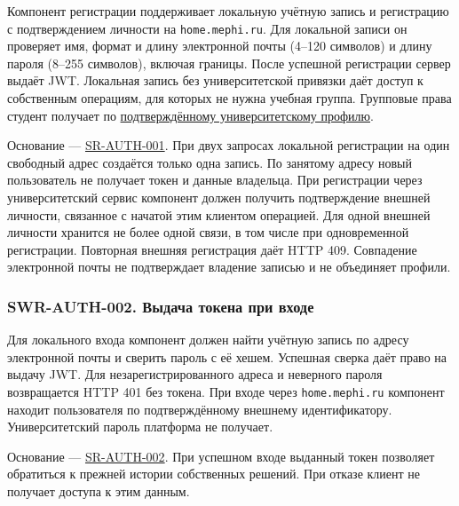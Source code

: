\documentclass[12pt,a4paper]{article}
\begin{document}
\hypertarget{swr-auth-001-создание-учётной-записи}{}

\hypertarget{swr-auth-001}{}

Компонент регистрации поддерживает локальную учётную запись и регистрацию с подтверждением личности на \texttt{home.\allowbreak{}mephi.\allowbreak{}ru}. Для локальной записи он проверяет имя, формат и длину электронной почты (4--120 символов) и длину пароля (8--255 символов), включая границы. После успешной регистрации сервер выдаёт JWT. Локальная запись без университетской привязки даёт доступ к собственным операциям, для которых не нужна учебная группа. Групповые права студент получает по {\hyperlink{swr-auth-006}{подтверждённому университетскому профилю}}.

Основание --- {\href{../04\_Системные\_требования/DOC-05\_Системные\_требования.pdf\#sr-auth-001}{SR-AUTH-001}}. При двух запросах локальной регистрации на один свободный адрес создаётся только одна запись. По занятому адресу новый пользователь не получает токен и данные владельца. При регистрации через университетский сервис компонент должен получить подтверждение внешней личности, связанное с начатой этим клиентом операцией. Для одной внешней личности хранится не более одной связи, в том числе при одновременной регистрации. Повторная внешняя регистрация даёт HTTP 409. Совпадение электронной почты не подтверждает владение записью и не объединяет профили.

\subsubsection{SWR-AUTH-002. Выдача токена при входе}\label{swr-auth-002-ux432ux44bux434ux430ux447ux430-ux442ux43eux43aux435ux43dux430-ux43fux440ux438-ux432ux445ux43eux434ux435}

\hypertarget{swr-auth-002-выдача-токена-при-входе}{}

\hypertarget{swr-auth-002}{}

Для локального входа компонент должен найти учётную запись по адресу электронной почты и сверить пароль с её хешем. Успешная сверка даёт право на выдачу JWT. Для незарегистрированного адреса и неверного пароля возвращается HTTP 401 без токена. При входе через \texttt{home.\allowbreak{}mephi.\allowbreak{}ru} компонент находит пользователя по подтверждённому внешнему идентификатору. Университетский пароль платформа не получает.

Основание --- {\href{../04\_Системные\_требования/DOC-05\_Системные\_требования.pdf\#sr-auth-002}{SR-AUTH-002}}. При успешном входе выданный токен позволяет обратиться к прежней истории собственных решений. При отказе клиент не получает доступа к этим данным.
\end{document}
